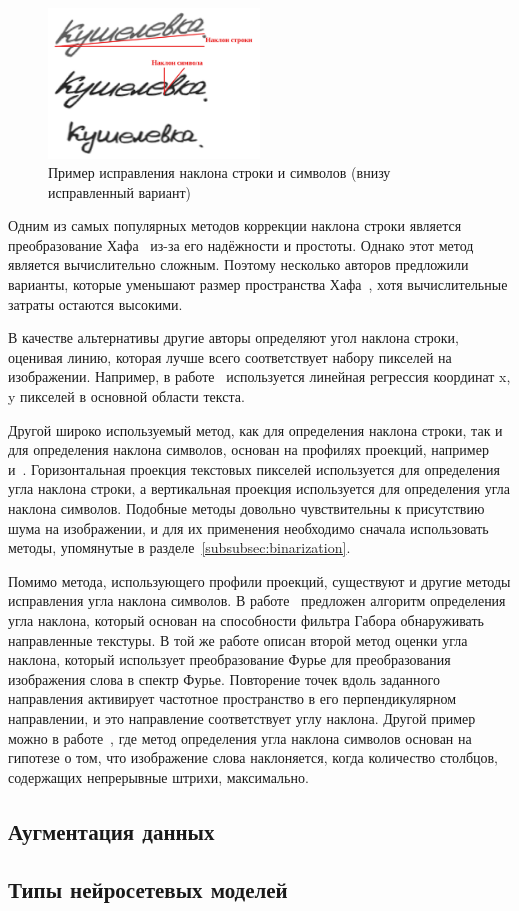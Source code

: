 \begin{figure}[h!]
    \centering
    \includegraphics[width=0.5\textwidth]{img/slant-slope}
    \caption{Пример исправления наклона строки и символов (внизу исправленный вариант)}
    \label{fig:slope-slant}
\end{figure}

Одним из самых популярных методов коррекции наклона строки является преобразование Хафа~\cite{duda1972use} из-за его надёжности и простоты.
Однако этот метод является вычислительно сложным.
Поэтому несколько авторов предложили варианты, которые уменьшают размер пространства Хафа~\cite{pal1996improved,boukharouba2017new}, хотя вычислительные затраты остаются высокими.

В качестве альтернативы другие авторы определяют угол наклона строки, оценивая линию, которая лучше всего соответствует набору пикселей на изображении.
Например, в работе~\cite{gupta2014efficient} используется линейная регрессия координат x, y пикселей в основной области текста.

Другой широко используемый метод, как для определения наклона строки, так и для определения наклона символов, основан на профилях проекций, например~\cite{kavallieratou2002skew} и~\cite{pastor2004projection}.
Горизонтальная проекция текстовых пикселей используется для определения угла наклона строки, а вертикальная проекция используется для определения угла наклона символов.
Подобные методы довольно чувствительны к присутствию шума на изображении, и для их применения необходимо сначала использовать методы, упомянутые в разделе~\ref{subsubsec:binarization}.

Помимо метода, использующего профили проекций, существуют и другие методы исправления угла наклона символов.
В работе~\cite{gupta2012novel} предложен алгоритм определения угла наклона, который основан на способности фильтра Габора обнаруживать направленные текстуры.
В той же работе описан второй метод оценки угла наклона, который использует преобразование Фурье для преобразования изображения слова в спектр Фурье.
Повторение точек вдоль заданного направления активирует частотное пространство в его перпендикулярном направлении, и это направление соответствует углу наклона.
Другой пример можно в работе~\cite{vinciarelli2001new}, где метод определения угла наклона символов основан на гипотезе о том,
что изображение слова наклоняется, когда количество столбцов, содержащих непрерывные штрихи, максимально.


\subsection{Аугментация данных}
\label{subsec:augmentation}





\subsection{Типы нейросетевых моделей}
\label{subsec:networks-description}

